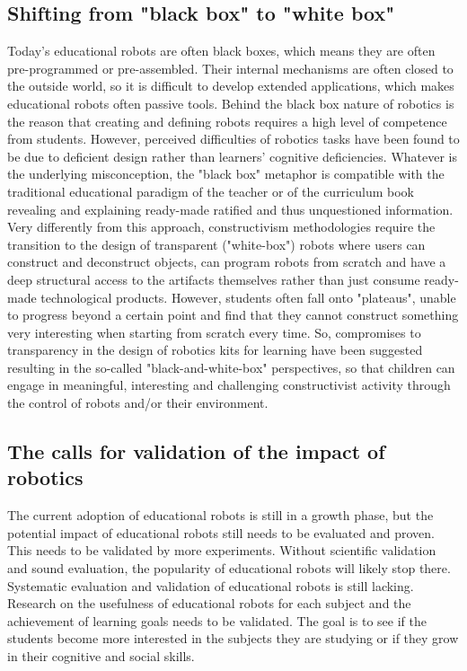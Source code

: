 \documentclass[a4paper,11pt]{article}
\begin{document}
\subsection{Shifting from "black box" to "white box"}
Today's educational robots are often black boxes, which means they are often pre-programmed or pre-assembled. Their internal mechanisms are often closed to the outside world, so it is difficult to develop extended applications, which makes educational robots often passive tools\cite{alimisis2013educational}. Behind the black box nature of robotics is the reason that creating and defining robots requires a high level of competence from students. However, perceived difficulties of robotics tasks have been found to be due to deficient design rather than learners' cognitive deficiencies. Whatever is the underlying misconception, the "black box" metaphor is compatible with the traditional educational paradigm of the teacher or of the curriculum book revealing and explaining ready-made ratified and thus unquestioned information. Very differently from this approach, constructivism methodologies require the transition to the design of transparent ("white-box") robots where users can construct and deconstruct objects, can program robots from scratch and have a deep structural access to the artifacts themselves rather than just consume ready-made technological products. However, students often fall onto "plateaus", unable to progress beyond a certain point and find that they cannot construct something very interesting when starting from scratch every time. So, compromises to transparency in the design of robotics kits for learning have been suggested resulting in the so-called "black-and-white-box" perspectives, so that children can engage in meaningful, interesting and challenging constructivist activity through the control of robots and/or their environment.



\subsection{The calls for validation of the impact of robotics}
The current adoption of educational robots is still in a growth phase, but the potential impact of educational robots still needs to be evaluated and proven. This needs to be validated by more experiments\cite{bredenfeld2010robotics}. Without scientific validation and sound evaluation, the popularity of educational robots will likely stop there. Systematic evaluation and validation of educational robots is still lacking. Research on the usefulness of educational robots for each subject and the achievement of learning goals needs to be validated. The goal is to see if the students become more interested in the subjects they are studying or if they grow in their cognitive and social skills.

\clearpage


\end{document}
